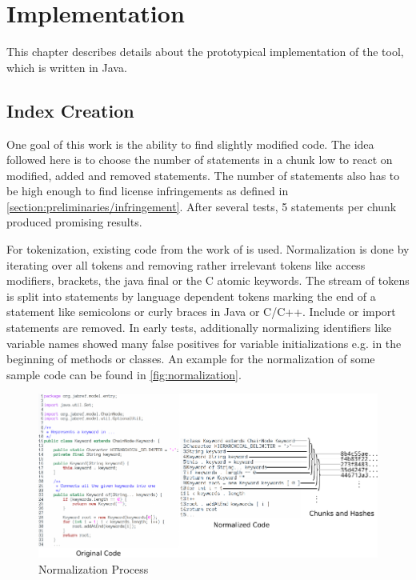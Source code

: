
\chapter{Implementation}\label{chapter:implementation}
This chapter describes details about the prototypical implementation of the tool, which is written in Java.

\section{Index Creation}\label{section:implementation/index_creation}
One goal of this work is the ability to find slightly modified code.
The idea followed here is to choose the number of statements in a chunk low to react on modified, added and removed statements.
The number of statements also has to be high enough to find license infringements as defined in \autoref{section:preliminaries/infringement}.
After several tests, 5 statements per chunk produced promising results.

For tokenization, existing code from the work of \cite{heinemann2014teamscale} is used.
Normalization is done by iterating over all tokens and removing rather irrelevant tokens like access modifiers, brackets, the java final or the C atomic keywords.
The stream of tokens is split into statements by language dependent tokens marking the end of a statement like semicolons or curly braces in Java or C/C++.
Include or import statements are removed.
In early tests, additionally normalizing identifiers like variable names showed many false positives for variable initializations e.g. in the beginning of methods or classes.
An example for the normalization of some sample code can be found in \autoref{fig:normalization}.

\begin{figure}[h]
	\centering
	\includegraphics[width=\linewidth]{figures/normalization.pdf}
	\caption{Normalization Process}\label{fig:normalization}
\end{figure}

